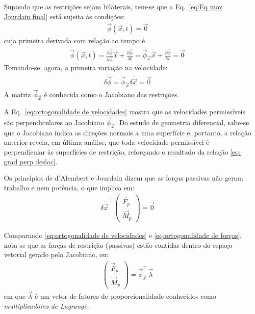 Supondo que as restrições sejam bilaterais, tem-se que a Eq.~\eqref{eq:Eq mov Jourdain final} está sujeita às condições:
\begin{align}
 \vec{\phi}(\vec{x},t) = \vec{0}
\end{align}
cuja primeira derivada com relação ao tempo é
\begin{align}
 \dot{\vec{\phi}}(\vec{x},t) = \frac{\partial\vec{\phi}}{\partial\vec{x}}\dot{\vec{x}} + \frac{\partial\vec{\phi}}{\partial{t}} = \vec{\phi}_{\vec{x}}\dot{\vec{x}} + \frac{\partial{\vec{\phi}}}{\partial{t}} = \vec{0} \label{eq:primeira derivada das restrições}
\end{align}
Tomando-se, agora, a primeira variação na velocidade:
\begin{align}
 \delta\dot{\vec{\phi}} = \vec{\phi}_{\vec{x}} \delta\dot{\vec{x}} = \vec{0} \label{eq:ortogonalidade de velocidades}
\end{align}
A matriz $\vec{\phi}_{\vec{x}}$ é conhecida como o Jacobiano das restrições.

A Eq.~\eqref{eq:ortogonalidade de velocidades} mostra que as velocidades permissíveis são perpendiculares ao Jacobiano $\vec{\phi}_{\vec{x}}$. Do estudo de geometria diferencial, sabe-se que o Jacobiano indica as direções normais a uma superfície e, portanto, a relação anterior revela, em última análise, que toda velocidade permissível é perpendicular às superfícies de restrição, reforçando o resultado da relação \ref{eq: grad perp desloc}.

Os princípios de d'Alembert e Jourdain dizem que as forças passivas não geram trabalho e nem potência, o que implica em:
\begin{align}
 \delta\dot{\vec{x}}^\intercal\,\begin{pmatrix}
                      \vec{F}_p \\ \vec{M}_p
                     \end{pmatrix} =
                     \vec{0} \label{eq:ortogonalidade de forças}
\end{align}

Comparando \eqref{eq:ortogonalidade de velocidades} e \eqref{eq:ortogonalidade de forças}, nota-se que as forças de restrição (passivas) estão contidas dentro do espaço vetorial gerado pelo Jacobiano, ou:
\begin{align}
 \begin{pmatrix}
 \vec{F}_p \\ \vec{M}_p
 \end{pmatrix} = \vec{\phi}_{\vec{x}}^\intercal\,\vec{\lambda}
 \label{eq:relação força mult Lagrange}
\end{align}
em que $\vec{\lambda}$ é um vetor de fatores de proporcionalidade conhecidos como \textit{multiplicadores de Lagrange}.

